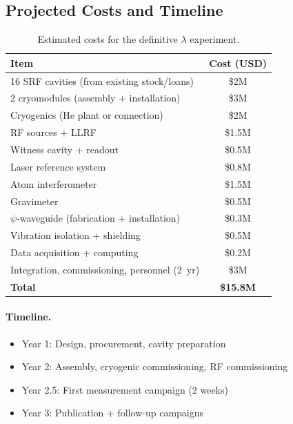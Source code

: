 \documentclass[aps,prd,twocolumn,superscriptaddress,floatfix,nofootinbib]{revtex4-2}
\begin{document}
\subsection{Projected Costs and Timeline}\label{sec:costs}

\begin{table}[h]
\caption{Estimated costs for the definitive $\lambda$ experiment.}
\label{tab:costs}
\begin{ruledtabular}
\begin{tabular}{lc}
Item & Cost (USD) \\
\hline
16 SRF cavities (from existing stock/loans) & \$2M \\
2 cryomodules (assembly + installation) & \$3M \\
Cryogenics (He plant or connection) & \$2M \\
RF sources + LLRF & \$1.5M \\
Witness cavity + readout & \$0.5M \\
Laser reference system & \$0.8M \\
Atom interferometer & \$1.5M \\
Gravimeter & \$0.5M \\
$\psi$-waveguide (fabrication + installation) & \$0.3M \\
Vibration isolation + shielding & \$0.5M \\
Data acquisition + computing & \$0.2M \\
Integration, commissioning, personnel (2~yr) & \$3M \\
\hline
\textbf{Total} & \textbf{\$15.8M} \\
\end{tabular}
\end{ruledtabular}
\end{table}

\paragraph{Timeline.}
\begin{itemize}[nosep]
\item Year 1: Design, procurement, cavity preparation
\item Year 2: Assembly, cryogenic commissioning, RF commissioning
\item Year 2.5: First measurement campaign (2 weeks)
\item Year 3: Publication + follow-up campaigns
\end{itemize}
\end{document}
